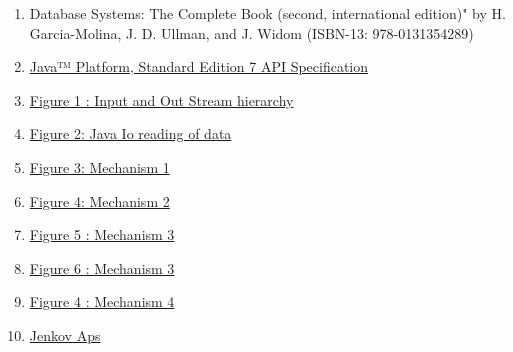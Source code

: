 \documentclass[14pt]{report}
\begin{document}
\begin{enumerate}
    
    \item  Database Systems: The Complete Book (second, international edition)" by H. Garcia-Molina, J. D. Ullman, and J. Widom (ISBN-13: 978-0131354289)
    
    \item \href{https://docs.oracle.com/javase/7/docs/api/overview-summary.html}{Java™ Platform, Standard Edition 7
    API Specification}
    \item  \href{https://www.google.com/search?q=input+stream+hierarchy&source=lnms&tbm=isch&sa=X&ved=0ahUKEwj9n9eWpZ_fAhUKzKQKHfaACb0Q_AUIDigB&biw=1366&bih=646#imgrc=Xbj3BKTrSTNGZM:}{Figure 1 : Input and Out Stream hierarchy }
    
    \item \href{http://tutorials.jenkov.com/java-nio/nio-vs-io.html}{Figure 2: Java Io reading of data}
    
    \item \href{https://www.google.com/search?biw=1366&bih=646&tbm=isch&sa=1&ei=kZ4TXPP5G461sAeWxKWgAw&q=datainputstream&oq=datainputstream&gs_l=img.3..35i39j0i19.74343.80934..81271...0.0..0.86.918.15......1....1..gws-wiz-img.......0j0i67j0i30i19.Rg1qcvj8v9Y#imgrc=MRbSWbZnatg-8M:}{Figure 3: Mechanism 1}
    
    \item \href{https://www.google.com/search?biw=1366&bih=646&tbm=isch&sa=1&ei=050TXIeND8jSkgWJmJb4AQ&q=fileinputstream+in+java&oq=fileInput&gs_l=img.3.0.0i19l2j0i30i19.182482.184642..188772...0.0..0.68.561.9......1....1..gws-wiz-img.......0j35i39j0i67j0i30j0i5i10i30j0i10i19j0i5i10i30i19j0i5i30i19.OTF1fI5reag#imgrc=m6lNYaxceTUCoM:}{Figure 4: Mechanism 2}
    
    \item \href{https://www.google.com/search?biw=1366&bih=646&tbm=isch&sa=1&ei=L6ATXPnGPNKYkwXX-4qgDQ&q=buffer+java&oq=buffer+java&gs_l=img.3..0i19j0i8i30i19.2357.3835..4507...0.0..0.72.323.5......1....1..gws-wiz-img.......0j0i67j0i10i19j0i30i19j0i5i30i19.KntnYA7ZfZM#imgdii=My8OPyhCq7u_6M:&imgrc=GGdCTHcprGiAaM:}{Figure 5 : Mechanism 3 }
    
    \item \href{http://tutorials.jenkov.com/java-nio/buffers.html}{Figure 6 : Mechanism 3 }
    
    \item \href{https://www.google.com/search?biw=1366&bih=646&tbm=isch&sa=1&ei=1p8TXOnAGsLWwQLj56rYBg&q=memory-mapped+file&oq=memory&gs_l=img.3.0.35i39l2j0l8.28492.29811..31289...0.0..0.66.373.6......1....1..gws-wiz-img.......0i67.HAODKhJsJ24#imgrc=OSoWWby55ER2jM:}{Figure 4 : Mechanism 4}
    
    \item \href{http://tutorials.jenkov.com/}{Jenkov Aps}
    
\end{enumerate}
\end{document}
